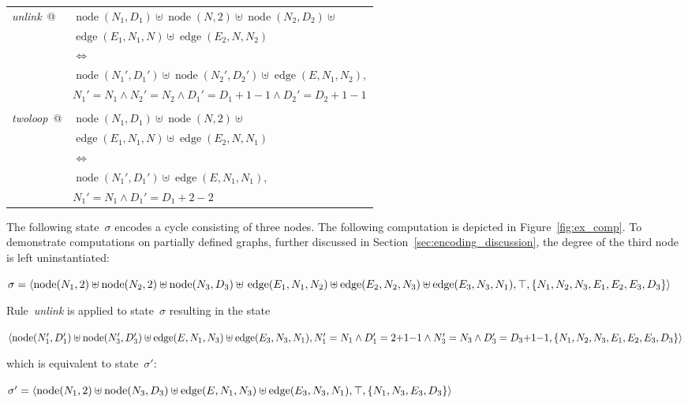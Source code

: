 \documentclass{tlp}
\newcommand{\st}[3]{\ensuremath{\langle #1 , #2 , #3 \rangle}}
\DeclareMathOperator{\node}{node}
\DeclareMathOperator{\edge}{edge}
\begin{document}
\begin{center} 
\begin{tabular}{ll}
\emph{unlink}\ @ & $\node(N_1, D_1) \uplus \node(N, 2) \uplus \node(N_2,
D_2) \uplus$\\
				& $\edge(E_1, N_1, N) \uplus \edge(E_2, N, N_2)$\\
                & $\Leftrightarrow$\\
                & $\node(N_1', D_1') \uplus \node(N_2', D_2') \uplus \edge(E,
                N_1, N_2),$\\
                & $N_1' = N_1 \land N_2' = N_2 \land D_1' = D_1{+}1{-}1
                \land D_2' = D_2{+}1{-}1$\\
                &\\
\emph{twoloop}\ @ & $\node(N_1, D_1) \uplus \node(N, 2) \uplus$ \\
				 & $\edge(E_1, N_1, N) \uplus \edge(E_2, N, N_1)$ \\
				 & $\Leftrightarrow$ \\
				 & $\node(N_1', D_1') \uplus \edge(E, N_1, N_1),$\\
				 & $N_1' = N_1 \land D_1' = D_1{+}2{-}2$
\end{tabular}
\end{center}

The following state~$\sigma$ encodes a cycle consisting of three nodes. The
following computation is depicted in Figure~\ref{fig:ex_comp}. To demonstrate
computations on partially defined graphs, further discussed in
Section~\ref{sec:encoding_discussion}, the degree of the third node is left
uninstantiated:

$\sigma = \st{\node(N_1, 2) \uplus \node(N_2, 2) \uplus \node(N_3, D_3) \uplus\\
\edge(E_1, N_1, N_2) \uplus \edge(E_2, N_2, N_3) \uplus \edge(E_3,
N_3, N_1)}{\\\top}{\{N_1, N_2, N_3, E_1, E_2, E_3, D_3\}}$

Rule~\emph{unlink} is applied to state~$\sigma$ resulting in the state

$\st{\node(N_1', D_1') \uplus \node(N_3', D_3') \uplus \edge(E, N_1,
N_3) \uplus \edge(E_3, N_3, N_1)}{\\N_1' = N_1 \land D_1' = 2{+}1{-}1
\land N_3' = N_3 \land D_3' = D_3{+}1{-}1}{\{N_1, N_2, N_3, E_1, E_2, E_3,
D_3\}}$

which is equivalent to state~$\sigma'$:

$\sigma' = \st{\node(N_1, 2)\uplus \node(N_3, D_3) \uplus \edge(E, N_1,
N_3) \uplus \edge(E_3, N_3, N_1)}{\\\top}{\{N_1, N_3, E_3, D_3\}}$
\end{document}
